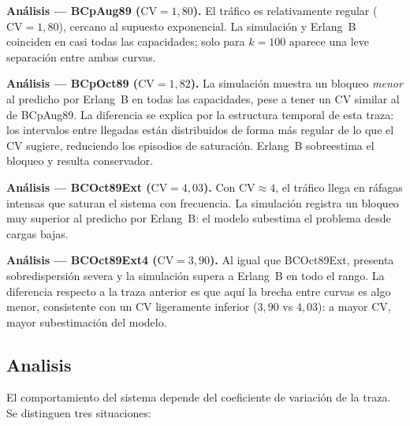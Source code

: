 \documentclass[12pt,a4paper]{article}
\theoremstyle{definition}
\theoremstyle{plain}
\theoremstyle{remark}
\begin{document}

\noindent
\textbf{Análisis --- BCpAug89 ($\mathrm{CV}=1{,}80$).}
El tráfico es relativamente regular ($\mathrm{CV}=1{,}80$), cercano al supuesto
exponencial. La simulación y Erlang~B coinciden en casi todas las capacidades;
solo para $k=100$ aparece una leve separación entre ambas curvas.


\noindent
\textbf{Análisis --- BCpOct89 ($\mathrm{CV}=1{,}82$).}
La simulación muestra un bloqueo \emph{menor} al predicho por Erlang~B en
todas las capacidades, pese a tener un CV similar al de BCpAug89. La diferencia
se explica por la estructura temporal de esta traza: los intervalos entre llegadas
están distribuidos de forma más regular de lo que el CV sugiere, reduciendo los
episodios de saturación. Erlang~B sobreestima el bloqueo y resulta conservador.


\noindent
\textbf{Análisis --- BCOct89Ext ($\mathrm{CV}=4{,}03$).}
Con $\mathrm{CV}\approx4$, el tráfico llega en ráfagas intensas que saturan
el sistema con frecuencia. La simulación registra un bloqueo muy superior al
predicho por Erlang~B: el modelo subestima el problema desde cargas bajas.


\noindent
\textbf{Análisis --- BCOct89Ext4 ($\mathrm{CV}=3{,}90$).}
Al igual que BCOct89Ext, presenta sobredispersión severa y la simulación supera
a Erlang~B en todo el rango. La diferencia respecto a la traza anterior es que
aquí la brecha entre curvas es algo menor, consistente con un CV ligeramente
inferior ($3{,}90$ vs $4{,}03$): a mayor CV, mayor subestimación del modelo.

\subsection*{Analisis}

El comportamiento del sistema
depende del coeficiente de variación de la traza. Se distinguen tres situaciones:
\end{document}
